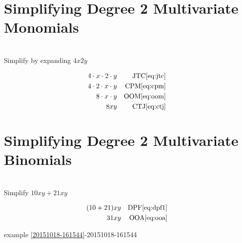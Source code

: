 \documentclass[20150903-160354-rs2.2-MarksMathNotebook.tex]{subfiles}
\begin{document}
\section{Simplifying Degree 2 Multivariate Monomials}

\begin{example}[id:20151018-161315] \label{20151018-161315} \hfill \\
Simplify by expanding $4x2y$

\soln

\solnsteps
\begin{align*}
4 \cdot x \cdot 2 \cdot y && \text{JTC} \eqref{eq:jtc} \\
4 \cdot 2 \cdot x \cdot y && \text{CPM} \eqref{eq:cpm} \\
8 \cdot x \cdot y && \text{OOM} \eqref{eq:oom} \\
8xy && \text{CTJ} \eqref{eq:ctj} 
\end{align*}
\end{example}



\section{Simplifying Degree 2 Multivariate Binomials}\label{Simplify! Degree 2 Multivariate Binomials}

\begin{example}[id:20151018-164351] \label{20151018-164351} \hfill \\

Simplify $10xy + 21xy$

\soln

\solnsteps
\begin{align*}
(10+21)xy && \text{DPF} \eqref{eq:dpf1} \\
31xy && \text{OOA} \eqref{eq:ooa} 
\end{align*}

\qdepend

\qdependlist
example \ref{20151018-161544}-20151018-161544

\end{example}
\end{document}
